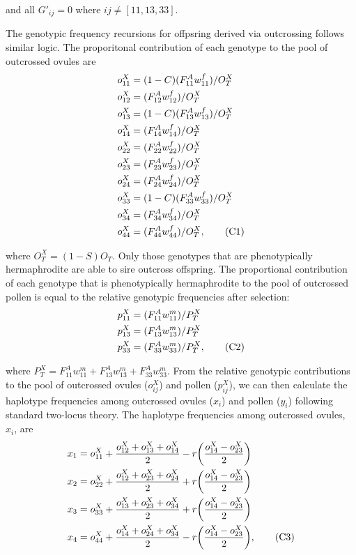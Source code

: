 \documentclass{article}
\newcommand\numberthis{\addtocounter{equation}{1}\tag{\theequation}}
\begin{document}
\noindent and all $G'_{ij} = 0$ where $ij \neq [11,13,33]$.

The genotypic frequency recursions for offpsring derived via outcrossing follows similar logic. The proporitonal contribution of each genotype to the pool of outcrossed ovules are
\begin{align*}
    o^X_{11} &= (1 - C) (F^A_{11} w^f_{11})/O^X_T \\
    o^X_{12} &= (F^A_{12} w^f_{12})/O^X_T \\
    o^X_{13} &= (1 - C) (F^A_{13} w^f_{13})/O^X_T \\
    o^X_{14} &= (F^A_{14} w^f_{14})/O^X_T \\
    o^X_{22} &= (F^A_{22} w^f_{22})/O^X_T \\
    o^X_{23} &= (F^A_{23} w^f_{23})/O^X_T \\
    o^X_{24} &= (F^A_{24} w^f_{24})/O^X_T \\
    o^X_{33} &= (1 - C) (F^A_{33} w^f_{33})/O^X_T \\
    o^X_{34} &= (F^A_{34} w^f_{34})/O^X_T \\
    o^X_{44} &= (F^A_{44} w^f_{44})/O^X_T, \numberthis
\end{align*}

\noindent where $O^X_T = (1 - S)O_T$. Only those genotypes that are phenotypically hermaphrodite are able to sire outcross offspring. The proportional contribution of each genotype  that is phenotypically hermaphrodite to the pool of outcrossed pollen is equal to the relative genotypic frequencies after selection:
\begin{align*}
    p^X_{11} &= (F^A_{11} w^m_{11}) / P^X_T \\
    p^X_{13} &= (F^A_{13} w^m_{13}) / P^X_T \\
    p^X_{33} &= (F^A_{33} w^m_{33}) / P^X_T, \numberthis
\end{align*}

\noindent where $P^X_T = F^A_{11} w^m_{11} + F^A_{13} w^m_{13} + F^A_{33} w^m_{33}$. From the relative genotypic contributions to the pool of outcrossed ovules ($o^X_{ij}$) and pollen ($p^X_{ij}$), we can then calculate the haplotype frequencies among outcrossed ovules ($x_i$) and pollen ($y_i$) following standard two-locus theory. The haplotype frequencies among outcrossed ovules, $x_i$, are
\begin{align*} 
    x_{1} &= o^X_{11} + \frac{o^X_{12} + o^X_{13} + o^X_{14}}{2} - r \bigg( \frac{o^X_{14} - o^X_{23}}{2} \bigg)  \\
    x_{2} &= o^X_{22} + \frac{o^X_{12} + o^X_{23} + o^X_{24}}{2} + r \bigg( \frac{o^X_{14} - o^X_{23}}{2} \bigg)  \\
    x_{3} &= o^X_{33} + \frac{o^X_{13} + o^X_{23} + o^X_{34}}{2} + r \bigg( \frac{o^X_{14} - o^X_{23}}{2} \bigg)  \\
    x_{4} &= o^X_{44} + \frac{o^X_{14} + o^X_{24} + o^X_{34}}{2} - r \bigg( \frac{o^X_{14} - o^X_{23}}{2} \bigg),  \numberthis
\end{align*}
\end{document}
